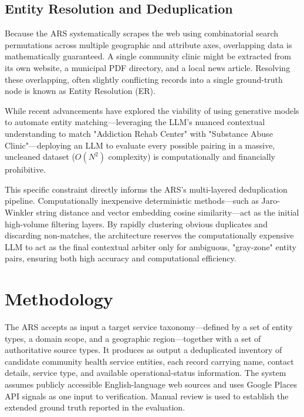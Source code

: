 \documentclass[12pt,oneside]{report}
\begin{document}
\subsection{Entity Resolution and Deduplication}
Because the ARS systematically scrapes the web using combinatorial search permutations across multiple geographic and attribute axes, overlapping data is mathematically guaranteed. A single community clinic might be extracted from its own website, a municipal PDF directory, and a local news article. Resolving these overlapping, often slightly conflicting records into a single ground-truth node is known as Entity Resolution (ER). 

While recent advancements have explored the viability of using generative models to automate entity matching—leveraging the LLM's nuanced contextual understanding to match "Addiction Rehab Center" with "Substance Abuse Clinic"—deploying an LLM to evaluate every possible pairing in a massive, uncleaned dataset ($O(N^2)$ complexity) is computationally and financially prohibitive. 

This specific constraint directly informs the ARS's multi-layered deduplication pipeline. Computationally inexpensive deterministic methods—such as Jaro-Winkler string distance and vector embedding cosine similarity—act as the initial high-volume filtering layers. By rapidly clustering obvious duplicates and discarding non-matches, the architecture reserves the computationally expensive LLM to act as the final contextual arbiter only for ambiguous, "gray-zone" entity pairs, ensuring both high accuracy and computational efficiency.

\section{Methodology}

The ARS accepts as input a target service taxonomy---defined by a set of entity types, a domain scope, and a geographic region---together with a set of authoritative source types. It produces as output a deduplicated inventory of candidate community health service entities, each record carrying name, contact details, service type, and available operational-status information. The system assumes publicly accessible English-language web sources and uses Google Places API signals as one input to verification. Manual review is used to establish the extended ground truth reported in the evaluation.
\end{document}
